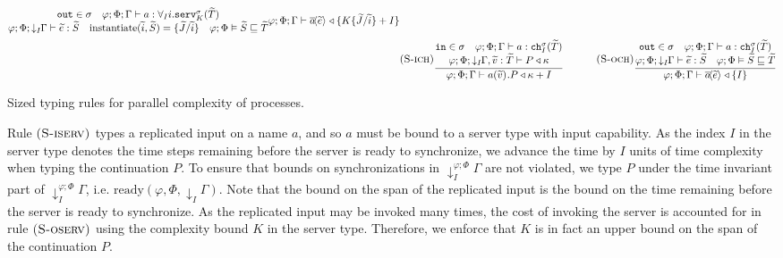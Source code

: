 \begin{table*}[!ht]
\begin{framed}
\begin{align*}
{\begin{matrix}
            \texttt{out} \in \sigma\quad \varphi;\Phi;\Gamma\vdash a:\servt{I}{i}{\sigma}{K}{\widetilde{T}}\\
            \varphi; \Phi;\tforwardsim{\Gamma}{I} \vdash \widetilde{e}:\widetilde{S} \quad \text{instantiate}(\widetilde{i}, \widetilde{S}) = \{\widetilde{J}/\widetilde{i}\} \quad \varphi;\Phi \vDash \widetilde{S} \sqsubseteq \widetilde{T}
        \end{matrix}}
        {\varphi;\Phi;\Gamma \vdash \asyncoutputch{a}{\widetilde{e}}{}\triangleleft \{K\{\widetilde{J}/\widetilde{i}\} + I\}}\\[-1em]
        &\runa{S-ich}\infrule{\begin{matrix}
            \texttt{in} \in \sigma\quad \varphi;\Phi;\Gamma \vdash a:\chant{\sigma}{I}{\widetilde{T}}\\
            \varphi; \Phi; \tforwardsim{\Gamma}{I}, \widetilde{v}:\widetilde{T} \vdash P \triangleleft \kappa
        \end{matrix}}
        {\varphi;\Phi;\Gamma \vdash \inputch{a}{\widetilde{v}}{}{P} \triangleleft \kappa + I}\kern3em
        \runa{S-och}\infrule{\begin{matrix}
            \texttt{out} \in \sigma\quad \varphi;\Phi;\Gamma \vdash a:\chant{\sigma}{I}{\widetilde{T}}\\
            \varphi; \Phi; \tforwardsim{\Gamma}{I} \vdash \widetilde{e}:\widetilde{S} \quad \varphi;\Phi \vDash \widetilde{S} \sqsubseteq \widetilde{T}
        \end{matrix}}
        {\varphi;\Phi;\Gamma \vdash \asyncoutputch{a}{\widetilde{e}}{} \triangleleft \{I\}}\\[-1em]
    \end{align*}\vspace{-1em}\end{framed}
    \smallskip
    \caption{Sized typing rules for parallel complexity of processes.}
    \label{tab:sizedprocesstypingrules}
\end{table*}

%
Rule $\mbox{\textsc{\protect{(S-iserv})}}$ types a replicated input on a name $a$, and so $a$ must be bound to a server type with input capability. As the index $I$ in the server type denotes the time steps remaining before the server is ready to synchronize, we advance the time by $I$ units of time complexity when typing the continuation $P$. To ensure that bounds on synchronizations in $\downarrow^{\varphi;\Phi}_I\!\Gamma$ are not violated, we type $P$ under the time invariant part of $\downarrow^{\varphi;\Phi}_I\!\Gamma$, i.e. $\text{ready}(\varphi,\Phi,\downarrow_I\!\Gamma)$. Note that the bound on the span of the replicated input is the bound on the time remaining before the server is ready to synchronize. As the replicated input may be invoked many times, the cost of invoking the server is accounted for in rule $\mbox{\textsc{\protect{(S-oserv})}}$ using the complexity bound $K$ in the server type. Therefore, we enforce that $K$ is in fact an upper bound on the span of the continuation $P$.\\

